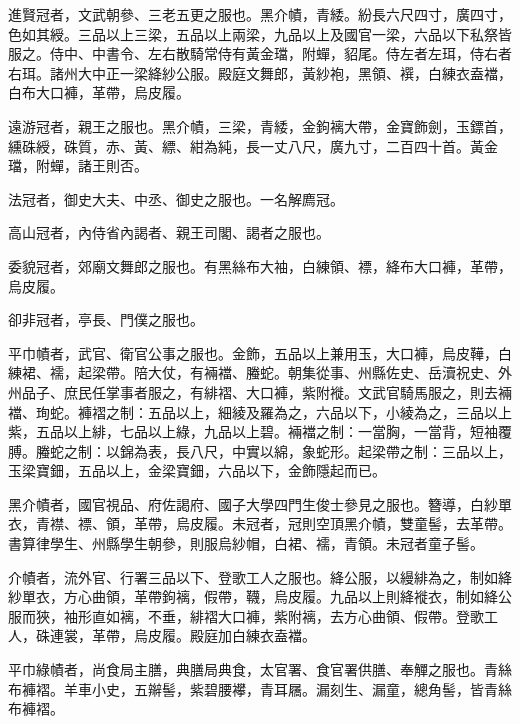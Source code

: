 \begin{pinyinscope}
 進賢冠者，文武朝參、三老五更之服也。黑介幘，青緌。紛長六尺四寸，廣四寸，色如其綬。三品以上三梁，五品以上兩梁，九品以上及國官一梁，六品以下私祭皆服之。侍中、中書令、左右散騎常侍有黃金璫，附蟬，貂尾。侍左者左珥，侍右者右珥。諸州大中正一梁絳紗公服。殿庭文舞郎，黃紗袍，黑領、襈，白練衣盍襠，白布大口褲，革帶，烏皮履。



 遠游冠者，親王之服也。黑介幘，三梁，青緌，金鉤褵大帶，金寶飾劍，玉鏢首，纁硃綬，硃質，赤、黃、縹、紺為純，長一丈八尺，廣九寸，二百四十首。黃金璫，附蟬，諸王則否。



 法冠者，御史大夫、中丞、御史之服也。一名解廌冠。



 高山冠者，內侍省內謁者、親王司閣、謁者之服也。



 委貌冠者，郊廟文舞郎之服也。有黑絲布大袖，白練領、褾，絳布大口褲，革帶，烏皮履。



 卻非冠者，亭長、門僕之服也。



 平巾幘者，武官、衛官公事之服也。金飾，五品以上兼用玉，大口褲，烏皮鞾，白練裙、襦，起梁帶。陪大仗，有裲襠、螣蛇。朝集從事、州縣佐史、岳瀆祝史、外州品子、庶民任掌事者服之，有緋褶、大口褲，紫附褷。文武官騎馬服之，則去裲襠、珣蛇。褲褶之制：五品以上，細綾及羅為之，六品以下，小綾為之，三品以上紫，五品以上緋，七品以上綠，九品以上碧。裲襠之制：一當胸，一當背，短袖覆膊。螣蛇之制：以錦為表，長八尺，中實以綿，象蛇形。起梁帶之制：三品以上，玉梁寶鈿，五品以上，金梁寶鈿，六品以下，金飾隱起而已。



 黑介幘者，國官視品、府佐謁府、國子大學四門生俊士參見之服也。簪導，白紗單衣，青襟、褾、領，革帶，烏皮履。未冠者，冠則空頂黑介幘，雙童髻，去革帶。書算律學生、州縣學生朝參，則服烏紗帽，白裙、襦，青領。未冠者童子髻。



 介幘者，流外官、行署三品以下、登歌工人之服也。絳公服，以縵緋為之，制如絳紗單衣，方心曲領，革帶鉤褵，假帶，韈，烏皮履。九品以上則絳褷衣，制如絳公服而狹，袖形直如褵，不垂，緋褶大口褲，紫附褵，去方心曲領、假帶。登歌工人，硃連裳，革帶，烏皮履。殿庭加白練衣盍襠。



 平巾綠幘者，尚食局主膳，典膳局典食，太官署、食官署供膳、奉觶之服也。青絲布褲褶。羊車小史，五辮髻，紫碧腰襻，青耳屩。漏刻生、漏童，總角髻，皆青絲布褲褶。




\end{pinyinscope}
